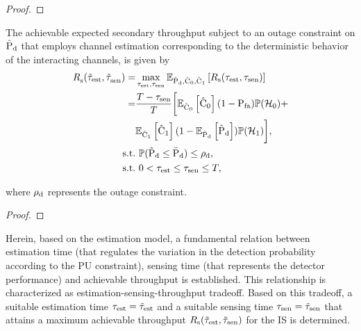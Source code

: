 \begin{proof}
\end{proof}

\begin{theorem} \label{th_IS:th2}
\normalfont
The achievable expected secondary throughput subject to an outage constraint on $\hat{\text{P}}_{\text{d}}$ that employs channel estimation corresponding to the deterministic behavior of the interacting channels, is given by  
\begin{align}
\trsoc(\ttest, \ttsenoc) =& \maxi_{\tc{\test}, \tsen} \e{\epd, \ecz, \eco}{\rs(\test, \tsen)} \nonumber \\ 
\quad =& \frac{T- \tsen}{T} \bigg[ \e{\ecz}{\ecz} (1 - \pfa) \phz + \nonumber \\ \quad & \e{\eco}{\eco} (1 - \e{\epd}{\epd}) \pho  \bigg], \label{eq_IS:thr_OC} \\
\text{s.t.} & \text{ }  \p(\epd \le \pdd) \le \mpd, \label{eq_IS:OC} \\
\tc{\text{s.t.}} & \text{ }  \tc{0 < \test \le \tsen \le T,} \nonumber
\end{align}
\end{theorem}
where $\rho_{\text{d}}$ represents the outage constraint.

\begin{proof}
\end{proof}
Herein, based on the estimation model, a fundamental relation between estimation time (that regulates the variation in the detection probability according to the PU constraint), sensing time (that represents the detector performance) and achievable throughput is established. This relationship is characterized as estimation-sensing-throughput tradeoff. Based on this tradeoff, a suitable estimation time $\tau_{\text{est}} = \tilde{\tau}_{\text{est}}$ and a suitable sensing time $\tau_{\text{sen}} = \tilde{\tau}_{\text{sen}}$ that attains a maximum achievable throughput $R_{\text{s}}(\tilde{\tau}_{\text{est}},\tilde{\tau}_{\text{sen}})$ for the IS is determined.

